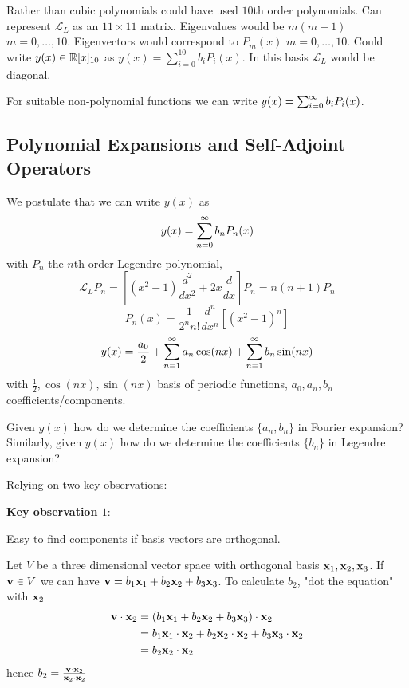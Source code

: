 \documentclass[10pt, a4paper]{article}
\begin{document}
Rather than cubic polynomials could have used $10$th order polynomials.
Can represent $\mathcal{L}_L$ as an $11 \times 11$ matrix.
Eigenvalues would be $m(m + 1)$ $m = 0, \dotsc, 10$.
Eigenvectors would correspond to $P_m(x)$ $m = 0, \dotsc, 10$.
Could write $y(x) \in \R[x]_{10}$ as $y(x) = \sum_{i = 0}^{10}b_iP_i(x)$.
In this basis $\mathcal{L}_L$ would be diagonal.

For suitable non-polynomial functions we can write $y(x) = \infsum[i = 0]b_iP_i(x)$.

\subsection{Polynomial Expansions and Self-Adjoint Operators}
We postulate that we can write $y(x)$ as
\[
y(x) = \infsum[n = 0]b_nP_n(x)
\]
with $P_n$ the $n$th order Legendre polynomial,
\[
\mathcal{L}_LP_n = \left[(x ^ 2 - 1)\frac{d ^ 2}{dx ^ 2} + 2x\frac{d}{dx}\right]P_n = n(n + 1)P_n
\]
\[
P_n(x) = \frac{1}{2 ^ nn!}\frac{d ^ n}{dx ^ n}\left[(x ^ 2 - 1) ^ n\right]
\]
\[
y(x) = \frac{a_0}{2} + \infsum[n = 1]a_n\cos(nx) + \infsum[n = 1]b_n\sin(nx)
\]
with $\frac{1}{2}, \cos(nx), \sin(nx)$ basis of periodic functions,
$a_0, a_n, b_n$ coefficients/components.

Given $y(x)$ how do we determine the coefficients $\{a_n, b_n\}$ in Fourier expansion?
Similarly,
given $y(x)$ how do we determine the coefficients $\{b_n\}$ in Legendre expansion?

Relying on two key observations:

\textbf{Key observation $1$}:

Easy to find components if basis vectors are orthogonal.

\begin{example}
    Let $V$ be a three dimensional vector space with orthogonal basis $\mbf{x}_1, \mbf{x}_2, \mbf{x}_3$.
    If $\mbf{v} \in V$ we can have $\mbf{v} = b_1\mbf{x}_1 + b_2\mbf{x}_2 + b_3\mbf{x}_3$.
    To calculate $b_2$,
    "dot the equation"
    with $\mbf{x}_2$
    \begin{align*}
        \mbf{v} \cdot \mbf{x}_2 &= (b_1\mbf{x}_1 + b_2\mbf{x}_2 + b_3\mbf{x}_3) \cdot \mbf{x}_2 \\
        &= b_1\mbf{x}_1\cdot\mbf{x}_2 + b_2\mbf{x}_2 \cdot \mbf{x}_2 + b_3\mbf{x}_3\cdot\mbf{x}_2 \\
        &= b_2\mbf{x}_2 \cdot \mbf{x}_2
    \end{align*}
    hence $b_2 = \frac{\mbf{v} \cdot \mbf{x}_2}{\mbf{x}_2 \cdot \mbf{x}_2}$
\end{example}
\end{document}
